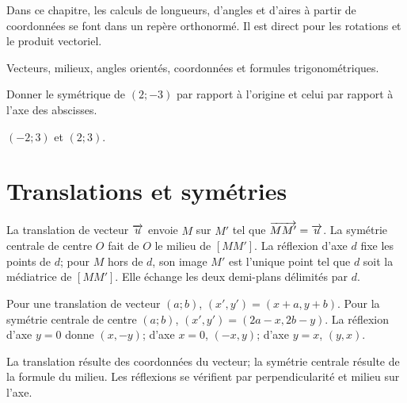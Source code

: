 \label{t11s-c15}
Dans ce chapitre, les calculs de longueurs, d’angles et d’aires à partir de coordonnées se font dans un repère orthonormé. Il est direct pour les rotations et le produit vectoriel.
\begin{revision}Vecteurs, milieux, angles orientés, coordonnées et formules trigonométriques.\end{revision}
\begin{automatismes}\exo\label{t11s-c15-auto}Donner le symétrique de $(2;-3)$ par rapport à l’origine et celui par rapport à l’axe des abscisses.\end{automatismes}
\begin{corrige}\label{sol-t11s-c15-auto}$(-2;3)$ et $(2;3)$.\end{corrige}

\section{Translations et symétries}
\begin{definition}La translation de vecteur $\overrightarrow{u}$ envoie $M$ sur $M'$ tel que $\overrightarrow{MM'}=\overrightarrow{u}$. La symétrie centrale de centre $O$ fait de $O$ le milieu de $[MM']$. La réflexion d’axe $d$ fixe les points de $d$; pour $M$ hors de $d$, son image $M'$ est l’unique point tel que $d$ soit la médiatrice de $[MM']$. Elle échange les deux demi-plans délimités par $d$.\end{definition}
\begin{propriete}
Pour une translation de vecteur $(a;b)$, $(x',y')=(x+a,y+b)$. Pour la symétrie centrale de centre $(a;b)$, $(x',y')=(2a-x,2b-y)$. La réflexion d’axe $y=0$ donne $(x,-y)$; d’axe $x=0$, $(-x,y)$; d’axe $y=x$, $(y,x)$.
\end{propriete}
\begin{demonstration}La translation résulte des coordonnées du vecteur; la symétrie centrale résulte de la formule du milieu. Les réflexions se vérifient par perpendicularité et milieu sur l’axe.\end{demonstration}
